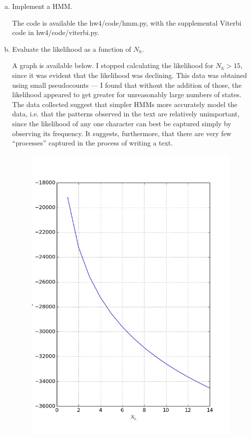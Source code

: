 \documentclass{article}
\newcommand\vtt[1]{{\normalfont\fontfamily{cmvtt}\selectfont #1}}
\begin{document}
\begin{enumerate}[(a)]
\item Implement a HMM.

The code is available the \vtt{hw4/code/hmm.py}, with the supplemental
Viterbi code in \vtt{hw4/code/viterbi.py}.

\item Evaluate the likelihood as a function of $N_h$.

A graph is available below. I stopped calculating the likelihood for
$N_h > 15$, since it was evident that the likelihood was
declining. This data was obtained using small pseudocounts --- I found
that without the addition of those, the likelihood appeared to get
greater for unreasonably large numbers of states. The data collected
suggest that simpler HMMs more accurately model the data, i.e. that
the patterns observed in the text are relatively unimportant, since
the likelihood of any one character can best be captured simply by
observing its frequency. It suggests, furthermore, that there are very
few ``processes'' captured in the process of writing a text.


\begin{figure}[f]
  \includegraphics[width=\textwidth]{./adj-likelihood.jpeg}
\end{figure}


\end{enumerate}
\end{document}
